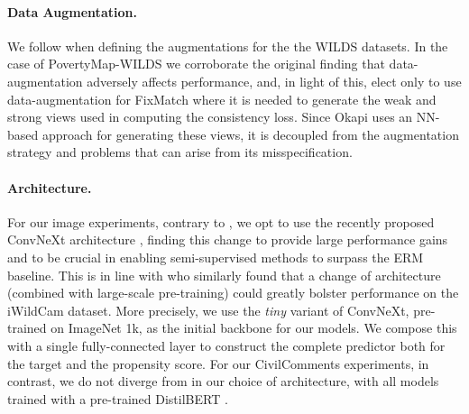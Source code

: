 \paragraph{Data Augmentation.} We follow \citet{SagWeiLeeGaoetal22} when defining the augmentations
for the the WILDS datasets.
%
In the case of PovertyMap-WILDS we corroborate the original finding that data-augmentation
adversely affects performance, and, in light of this, elect only to use data-augmentation for
FixMatch where it is needed to generate the weak and strong views used in computing the consistency
loss.
%
Since Okapi uses an NN-based approach for generating these views, it is decoupled from the
augmentation strategy and problems that can arise from its misspecification.

\paragraph{Architecture.} For our image experiments, contrary to \citet{SagWeiLeeGaoetal22}, we opt
to use the recently proposed ConvNeXt architecture \citep{liu2022convnet}, finding this change to
provide large performance gains and to be crucial in enabling semi-supervised methods to surpass
the ERM baseline.
%
This is in line with \citet{kim2022broad} who similarly found that a change of architecture
(combined with large-scale pre-training) could greatly bolster performance on the iWildCam dataset.
%
More precisely, we use the \emph{tiny} variant of ConvNeXt, pre-trained on ImageNet 1k, as the
initial backbone for our models. We compose this with a single fully-connected layer to construct
the complete predictor both for the target and the propensity score. For our CivilComments
experiments, in contrast, we do not diverge from \citet{SagWeiLeeGaoetal22} in our choice of
architecture, with all models trained with a pre-trained DistilBERT \citep{sanh2019distilbert}.

